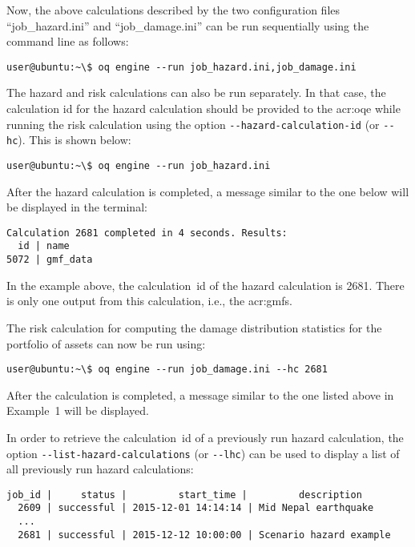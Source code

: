 Now, the above calculations described by the two configuration files
``job\_hazard.ini'' and ``job\_damage.ini'' can be run sequentially using the
command line as follows:

\begin{verbatim}
user@ubuntu:~\$ oq engine --run job_hazard.ini,job_damage.ini
\end{verbatim}

The hazard and risk calculations can also be run separately. In that case, the
calculation id for the hazard calculation should be
provided to the \glsdesc{acr:oqe} while running the risk calculation using the
option \Verb+--hazard-calculation-id+ (or \Verb+--hc+). This is shown below:

\begin{verbatim}
user@ubuntu:~\$ oq engine --run job_hazard.ini
\end{verbatim}

After the hazard calculation is completed, a message similar to the one below
will be displayed in the terminal:

\begin{verbatim}
Calculation 2681 completed in 4 seconds. Results:
  id | name
5072 | gmf_data
\end{verbatim}

In the example above, the calculation~id of the hazard calculation is 2681.
There is only one output from this calculation, i.e., the \glspl{acr:gmf}.

The risk calculation for computing the damage distribution statistics for the
portfolio of \glspl{asset} can now be run using:

\begin{verbatim}
user@ubuntu:~\$ oq engine --run job_damage.ini --hc 2681
\end{verbatim}

After the calculation is completed, a message similar to the one listed above
in Example~1 will be displayed.

In order to retrieve the calculation~id of a previously run hazard calculation,
the option \Verb+--list-hazard-calculations+ (or \Verb+--lhc+) can be used to
display a list of all previously run hazard calculations:

\begin{verbatim}
job_id |     status |         start_time |         description
  2609 | successful | 2015-12-01 14:14:14 | Mid Nepal earthquake
  ...
  2681 | successful | 2015-12-12 10:00:00 | Scenario hazard example
\end{verbatim}

